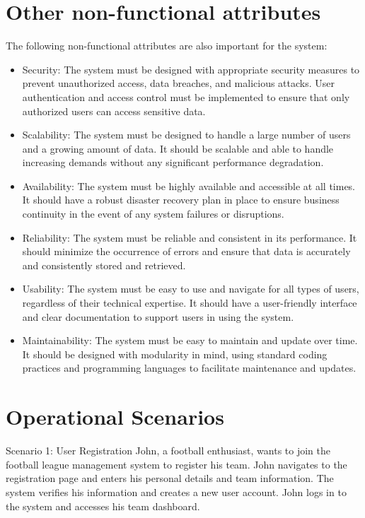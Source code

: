 \documentclass[12pt]{article}
\begin{document}
\section{Other non-functional attributes}
The following non-functional attributes are also important for the system:
\begin{itemize}
    \item Security: The system must be designed with appropriate security measures to prevent unauthorized access, data breaches, and malicious attacks. User authentication and access control must be implemented to ensure that only authorized users can access sensitive data.
    \item Scalability: The system must be designed to handle a large number of users and a growing amount of data. It should be scalable and able to handle increasing demands without any significant performance degradation.
    \item Availability: The system must be highly available and accessible at all times. It should have a robust disaster recovery plan in place to ensure business continuity in the event of any system failures or disruptions.
    \item Reliability: The system must be reliable and consistent in its performance. It should minimize the occurrence of errors and ensure that data is accurately and consistently stored and retrieved.
    \item Usability: The system must be easy to use and navigate for all types of users, regardless of their technical expertise. It should have a user-friendly interface and clear documentation to support users in using the system.
    \item Maintainability: The system must be easy to maintain and update over time. It should be designed with modularity in mind, using standard coding practices and programming languages to facilitate maintenance and updates.
\end{itemize}

\section{Operational Scenarios}
Scenario 1: User Registration
John, a football enthusiast, wants to join the football league management system to register his team. John navigates to the registration page and enters his personal details and team information. The system verifies his information and creates a new user account. John logs in to the system and accesses his team dashboard.
\end{document}
